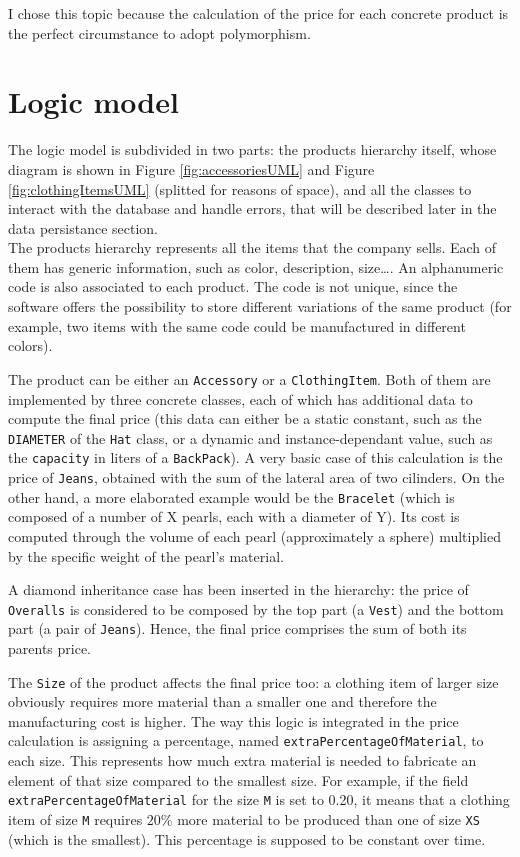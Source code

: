 \documentclass[10pt]{article}
\begin{document}
I chose this topic because the calculation of the price for each concrete
product is the perfect circumstance to adopt polymorphism.

\section{Logic model}
The logic model is subdivided in two parts: the products hierarchy itself,
whose diagram is shown in Figure \ref{fig:accessoriesUML} and Figure
\ref{fig:clothingItemsUML} (splitted for reasons of space), and all the classes
to interact with the database and handle errors, that will be described later
in the data persistance section. \\\linebreak The products hierarchy represents
all the items that the company sells. Each of them has generic information,
such as color, description, size\dots. An alphanumeric code is also associated
to each product. The code is not unique, since the software offers the
possibility to store different variations of the same product (for example, two
items with the same code could be manufactured in different colors).

The product can be either an \texttt{Accessory} or a \texttt{ClothingItem}.
Both of them are implemented by three concrete classes, each of which has
additional data to compute the final price (this data can either be a static
constant, such as the \texttt{DIAMETER} of the \texttt{Hat} class, or a dynamic
and instance-dependant value, such as the \texttt{capacity} in liters of a
\texttt{BackPack}). A very basic case of this calculation is the price of
\texttt{Jeans}, obtained with the sum of the lateral area of two cilinders. On
the other hand, a more elaborated example would be the \texttt{Bracelet} (which
is composed of a number of X pearls, each with a diameter of Y). Its cost is
computed through the volume of each pearl (approximately a sphere) multiplied
by the specific weight of the pearl's material.

A diamond inheritance case has been inserted in the hierarchy: the price of
\texttt{Overalls} is considered to be composed by the top part (a
\texttt{Vest}) and the bottom part (a pair of \texttt{Jeans}). Hence, the final
price comprises the sum of both its parents price.

The \texttt{Size} of the product affects the final price too: a clothing item
of larger size obviously requires more material than a smaller one and
therefore the manufacturing cost is higher. The way this logic is integrated in
the price calculation is assigning a percentage, named
\texttt{extraPercentageOfMaterial}, to each size. This represents how much
extra material is needed to fabricate an element of that size compared to the
smallest size. For example, if the field \texttt{extraPercentageOfMaterial} for
the size \texttt{M} is set to 0.20, it means that a clothing item of size
\texttt{M} requires $20\%$ more material to be produced than one of size
\texttt{XS} (which is the smallest). This percentage is supposed to be constant
over time.
\end{document}

